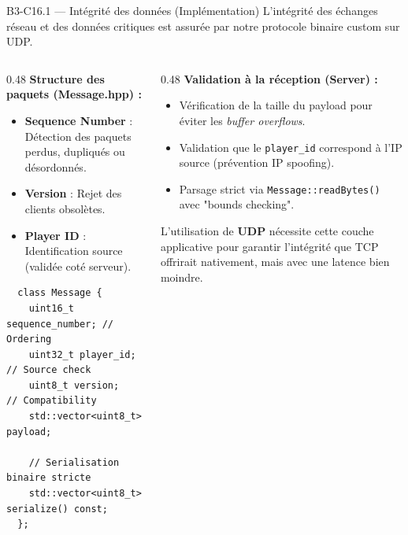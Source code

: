 \documentclass[aspectratio=169,10pt]{beamer}
\begin{document}
\begin{frame}[fragile]{B3-C16.1 — Intégrité des données (Implémentation)}
  \footnotesize
  L'intégrité des échanges réseau et des données critiques est assurée par notre protocole binaire custom sur UDP.
  
  \begin{columns}[T]
  \begin{column}{0.48\textwidth}
  \textbf{Structure des paquets (Message.hpp) :}
  \begin{itemize}
    \item \textbf{Sequence Number} : Détection des paquets perdus, dupliqués ou désordonnés.
    \item \textbf{Version} : Rejet des clients obsolètes.
    \item \textbf{Player ID} : Identification source (validée coté serveur).
  \end{itemize}
  
  \begin{lstlisting}
  class Message {
    uint16_t sequence_number; // Ordering
    uint32_t player_id;       // Source check
    uint8_t version;          // Compatibility
    std::vector<uint8_t> payload;
    
    // Serialisation binaire stricte
    std::vector<uint8_t> serialize() const;
  };
  \end{lstlisting}
  \end{column}
  
  \begin{column}{0.48\textwidth}
  \textbf{Validation à la réception (Server) :}
  \begin{itemize}
    \item Vérification de la taille du payload pour éviter les \textit{buffer overflows}.
    \item Validation que le \texttt{player\_id} correspond à l'IP source (prévention IP spoofing).
    \item Parsage strict via \texttt{Message::readBytes()} avec "bounds checking".
  \end{itemize}
  
  \vspace{0.3em}
  L'utilisation de \textbf{UDP} nécessite cette couche applicative pour garantir l'intégrité que TCP offrirait nativement, mais avec une latence bien moindre.
  \end{column}
  \end{columns}
\end{frame}
\end{document}
